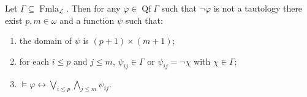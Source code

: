 Let $\Gamma \subseteq \operatorname{Fmla}_{\mathcal{L}}$. Then for any $\varphi \in \operatorname{Qf}\Gamma$ such that $\neg\varphi$ is not a tautology there exist $p, m \in \omega$ and a function $\psi$ such that:
\begin{enumerate}
\item[(i)] the domain of $\psi$ is $(p + 1) \times (m + 1)$;
\item[(ii)] for each $i \leq p$ and $j \leq m$, $\psi_{ij} \in \Gamma$ or $\psi_{ij} = \neg\chi$ with $\chi \in \Gamma$;
\item[(iii)] $\models \varphi \leftrightarrow \bigvee_{i \leq p} \bigwedge_{j \leq m} \psi_{ij}$.
\end{enumerate}
